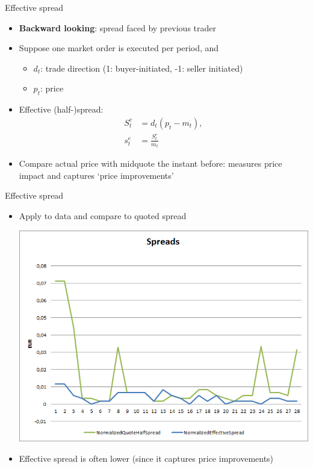 \documentclass[english,10pt
,aspectratio=169
]{beamer}
\begin{document}
\begin{frame}{Effective spread}
	\begin{itemize}
		\item \textbf{Backward looking}: spread faced by previous trader
		\item Suppose one market order is executed per period, and
		\begin{itemize}
			\item $d_t$: trade direction (1: buyer-initiated, -1: seller initiated)
			\item $p_t$:  price
		\end{itemize}
		\item \alert{Effective (half-)spread}: 
		\begin{align*}
		S^e_t & = d_t(p_t-m_{t}), \\
		s^e_t & = \frac{S^e_t}{m_{t}}
		\end{align*}
		\item Compare actual price with midquote the instant before: measures price impact and captures `price improvements'
	\end{itemize}
\end{frame}


\begin{frame}{Effective spread}
	\begin{itemize}
		\item Apply to data and compare to quoted spread
		\begin{center}
			\includegraphics[scale=0.39]{pics/L2_effectivespread}
		\end{center}
		\item Effective spread is often lower (since it captures price improvements)
	\end{itemize}
\end{frame}
\end{document}
